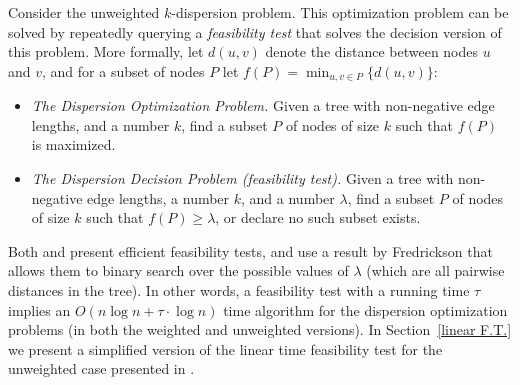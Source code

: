 \documentclass[a4paper,UKenglish]{lipics-v2016}
\theoremstyle{plain}
\newcommand{\Oh}{{O}}
\begin{document}
\medskip {}
Consider the unweighted $k$-dispersion problem. This optimization problem can be solved by repeatedly querying a {\em feasibility test} that solves the decision version of this problem. More formally, let $d(u,v)$ denote the distance between nodes $u$ and $v$, and for a subset of nodes $P$ let $f(P)=\min_{u,v\in P} \{d(u,v)\}$:


\begin{itemize} 
\item {\em The Dispersion Optimization Problem.} Given a tree with non-negative edge lengths, and a  number $k$, find a subset $P$ of nodes of size $k$ such that $f(P)$ is maximized. 

\item  {\em The Dispersion Decision Problem (feasibility test).}  Given a tree with non-negative edge lengths, a number $k$, and a number $\lambda$, find a subset $P$ of nodes of size $k$ such that  $f(P)\geq\lambda$, or declare no such subset exists. 
\end{itemize}

Both \cite{Bhattacharya1991} and \cite{Bhattacharya1999} present efficient feasibility tests, and use a result by Fredrickson \cite{Frederickson1983} that allows them to binary search over the possible values of $\lambda$ (which are all pairwise distances in the tree). In other words, a feasibility test with a running time $\tau$  implies an $O(n \log n + \tau \cdot \log n)$ time algorithm for the dispersion optimization problems (in both the weighted and unweighted versions). In Section~\ref{linear F.T.} we present a simplified version of the linear time feasibility test for the unweighted case presented in \cite{Bhattacharya1991}.
 
\end{document}
